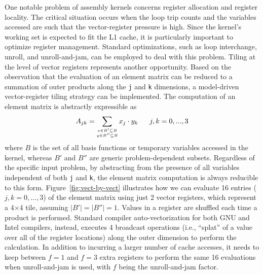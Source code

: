 One notable problem of assembly kernels concerns register allocation and register locality. The critical situation occurs when the loop trip counts and the variables accessed are such that the vector-register pressure is high. Since the kernel's working set is expected to fit the L1 cache, it is particularly important to optimize register management. Standard optimizations, such as loop interchange, unroll, and unroll-and-jam, can be employed to deal with this problem. Tiling at the level of vector registers represents another opportunity. Based on the observation that the evaluation of an element matrix can be reduced to a summation of outer products along the \texttt{j} and \texttt{k} dimensions, a model-driven vector-register tiling strategy can be implemented. The computation of an element matrix is abstractly expressible as
\begin{equation*}
\scriptsize
\label{outer-product}
A_{jk} = \sum_{\substack{
  x \in B' \subseteq B \\
  y \in B'' \subseteq B}}
x_j\cdot y_k ~~~~~~ j,k = 0,...,3
\end{equation*}
where $B$ is the set of all basis functions or temporary variables accessed in the kernel, whereas $B'$ and $B''$ are generic problem-dependent subsets. Regardless of the specific input problem, by abstracting from the presence of all variables independent of both \texttt{j} and \texttt{k}, the element matrix computation is always reducible to this form. Figure~\ref{fig:vect-by-vect} illustrates how we can evaluate 16 entries ($j,k=0,...,3$) of the element matrix using just 2 vector registers, which represent a 4$\times$4 tile, assuming $\vert B' \vert = \vert B'' \vert = 1$. Values in a register are shuffled each time a product is performed. Standard compiler auto-vectorization for both GNU and Intel compilers, instead, executes 4 broadcast operations (i.e., ``splat'' of a value over all of the register locations) along the outer dimension to perform the calculation. In addition to incurring a larger number of cache accesses, it needs to keep between $f=1$ and $f=3$ extra registers to perform the same 16 evaluations when unroll-and-jam is used, with $f$ being the unroll-and-jam factor.


